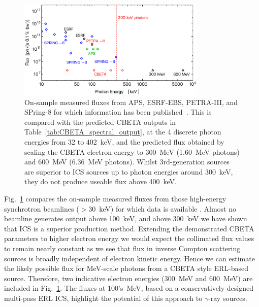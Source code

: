 \documentclass[../main.tex]{subfiles}
\begin{document}
\begin{figure}[!h]
\centering
\includegraphics[width=0.8\textwidth]{Figures/CBETA_Inverse_Compton_Source_Design/sourcefluxcomparison.pdf}
\caption{On-sample measured fluxes from APS, ESRF-EBS, PETRA-III, and SPring-8 for which information has been published~\cite{apsbeamlines,esrfbeamlines,petraiiibeamlines,spring8beamlines}. This is compared with the predicted CBETA outputs in Table~\ref{tab:CBETA_spectral_output}, at the 4 discrete photon energies from 32 to 402~\si{\kilo\electronvolt}, and the predicted flux obtained by scaling the CBETA electron energy to 300~\si{\mega\electronvolt} (1.60~\si{\mega\electronvolt} photons) and 600~\si{\mega\electronvolt} (6.36~\si{\mega\electronvolt} photons). Whilst 3rd-generation sources are superior to ICS sources up to photon energies around 300~\si{\kilo\electronvolt}, they do not produce useable flux above 400~\si{\kilo\electronvolt}.}
\label{fig:ICS_Undulator_Comparison}
\end{figure}

Fig.~\ref{fig:ICS_Undulator_Comparison} compares the on-sample measured fluxes from those high-energy synchrotron beamlines ($>$30~\si{\kilo\electronvolt}) for which data is available \cite{apsbeamlines,esrfbeamlines,petraiiibeamlines,spring8beamlines}. Almost no beamline generates output above 100~\si{\kilo\electronvolt}, and above 300~\si{\kilo\electronvolt} we have shown that ICS is a superior production method. Extending the demonstrated CBETA parameters to higher electron energy we would expect the collimated flux values to remain nearly constant as we see that flux in inverse Compton scattering sources is broadly independent of electron kinetic energy. Hence we can estimate the likely possible flux for \si{\mega\electronvolt}-scale photons from a CBETA style ERL-based source. Therefore, two indicative electron energies (300~\si{\mega\electronvolt} and 600~\si{\mega\electronvolt}) are included in Fig.~\ref{fig:ICS_Undulator_Comparison}. The fluxes at 100's~\si{\mega\electronvolt}, based on a conservatively designed multi-pass ERL ICS, highlight the potential of this approach to $\gamma$-ray sources. 
\end{document}
